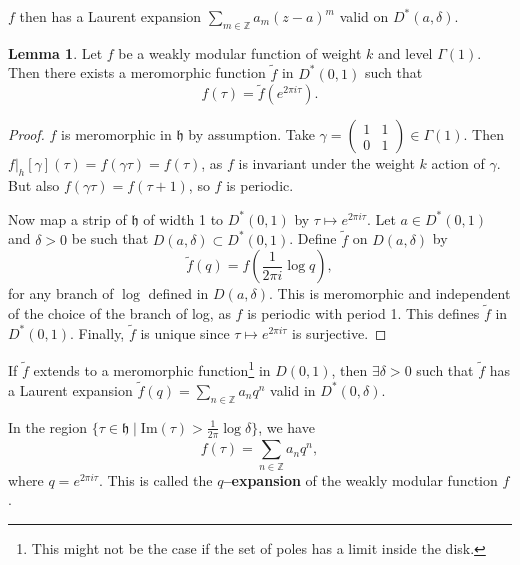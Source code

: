 \documentclass{article}
\theoremstyle{definition}
\newtheorem{lemma}[theorem]{Lemma}
\begin{document}
$f$ then has a Laurent expansion $\sum_{m \in \mathbb{Z}}^{} a_m (z-a)^{m}$ valid on $D^*(a,\delta)$.

\begin{lemma}
    Let $f$ be a weakly modular function of weight $k$ and level $\Gamma(1)$. Then there exists a meromorphic function $\tilde{f}$ in $D^*(0,1)$ such that $$f(\tau) = \tilde{f}(e^{2\pi i \tau}).$$
\end{lemma}
\begin{proof}
    $f$ is meromorphic in $\mathfrak{h}$ by assumption. Take $\gamma = \begin{pmatrix} 1 & 1 \\ 0 & 1 \end{pmatrix} \in \Gamma(1)$. Then $f|_h[\gamma](\tau) = f(\gamma \tau) = f(\tau)$, as $f$ is invariant under the weight $k$ action of $\gamma$. But also $f(\gamma \tau) = f(\tau+1)$, so $f$ is periodic. 
    \vspace{1mm}
     
    Now map a strip of $\mathfrak{h}$ of width 1 to $D^*(0,1)$ by $\tau \mapsto e^{2 \pi i \tau}$. Let $a \in D^*(0,1)$ and $\delta>0$ be such that $D(a,\delta) \subset D^*(0,1)$. Define $\tilde{f}$ on $D(a,\delta)$ by $$\tilde{f}(q) = f\left(\frac{1}{2\pi i} \log q\right),$$ for any branch of $\log$ defined in $D(a,\delta)$. This is meromorphic and independent of the choice of the branch of log, as $f$ is periodic with period 1. This defines $\tilde{f}$ in $D^*(0,1)$. Finally, $\tilde{f}$ is unique since $\tau \mapsto e^{2\pi i \tau}$ is surjective.
\end{proof}

If $\tilde{f}$ extends to a meromorphic function\footnote{This might not be the case if the set of poles has a limit inside the disk.} in $D(0,1)$, then $\exists \delta > 0$ such that $\tilde{f}$ has a Laurent expansion $\tilde{f}(q) = \sum_{n \in \mathbb{Z}}^{} a_n q^n$ valid in $D^*(0,\delta)$. 
\vspace{1mm}
 
In the region $\{\tau \in \mathfrak{h} \mid \text{Im}(\tau) > \frac{1}{2\pi} \log \delta\}$, we have $$f(\tau) = \sum_{n \in \mathbb{Z}}^{} a_nq^n,$$ where $q = e^{2\pi i \tau}$. This is called the \textbf{$q$--expansion} of the weakly modular function $f$.
\end{document}
